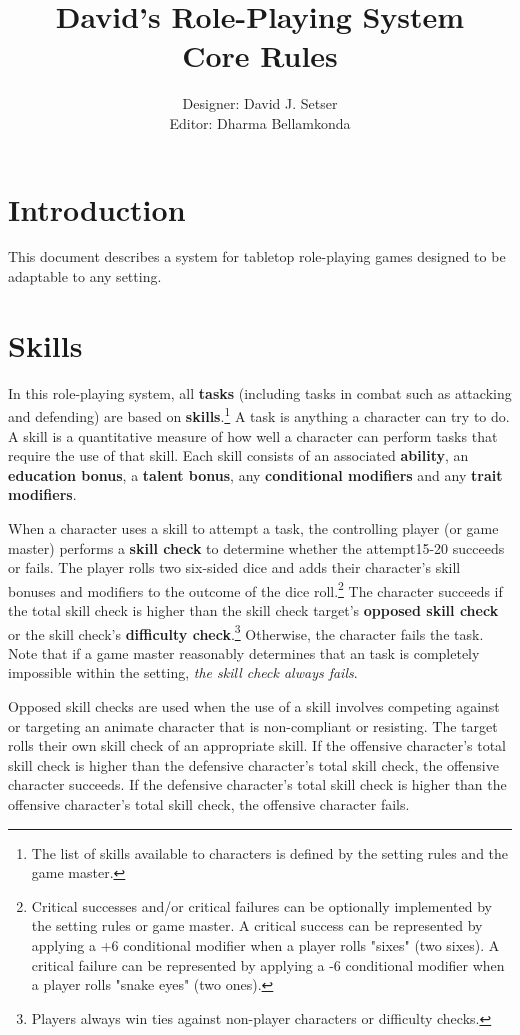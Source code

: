 \documentclass[11pt]{article}
\title{\textbf{David's Role-Playing System\\
Core Rules}}
\author{Designer: David J. Setser\\
Editor: Dharma Bellamkonda}
\date{}
\begin{document}
\maketitle

\section{Introduction}

This document describes a system for tabletop role-playing games designed to be adaptable to any setting.

\section{Skills}
In this role-playing system, all \textbf{tasks} (including tasks in combat such as attacking and defending) are based on \textbf{skills}.\footnote{The list of skills available to characters is defined by the setting rules and the game master.}
A task is anything a character can try to do.
A skill is a quantitative measure of how well a character can perform tasks that require the use of that skill.
Each skill consists of an associated \textbf{ability}, an \textbf{education bonus}, a \textbf{talent bonus}, any \textbf{conditional modifiers} and any \textbf{trait modifiers}.

When a character uses a skill to attempt a task, the controlling player (or game master) performs a \textbf{skill check} to determine whether the attempt15-20 succeeds or fails.
The player rolls two six-sided dice and adds their character's skill bonuses and modifiers to the outcome of the dice roll.\footnote{Critical successes and/or critical failures can be optionally implemented by the setting rules or game master.
A critical success can be represented by applying a +6 conditional modifier when a player rolls "sixes" (two sixes).
A critical failure can be represented by applying a -6 conditional modifier when a player rolls "snake eyes" (two ones).}
The character succeeds if the total skill check is higher than the skill check target's \textbf{opposed skill check} or the skill check's \textbf{difficulty check}.\footnote{Players always win ties against non-player characters or difficulty checks.} Otherwise, the character fails the task. Note that if a game master reasonably determines that an task is completely impossible within the setting, \emph{the skill check always fails}.

Opposed skill checks are used when the use of a skill involves competing against or targeting an animate character that is non-compliant or resisting.
The target rolls their own skill check of an appropriate skill.
If the offensive character's total skill check is higher than the defensive character's total skill check, the offensive character succeeds.
If the defensive character's total skill check is higher than the offensive character's total skill check, the offensive character fails.
\end{document}
